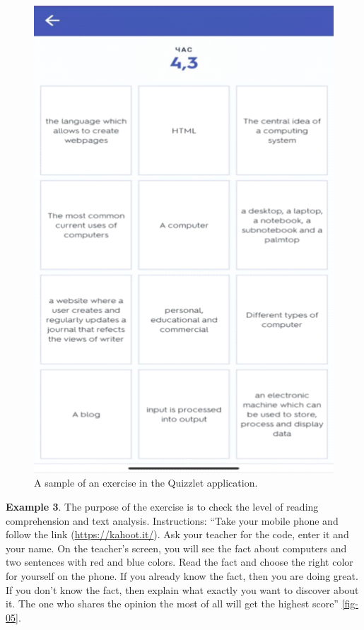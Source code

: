 \begin{figure}[htpb]
\centering
\begin{minipage}{.65\textwidth}
\caption{A sample of an exercise in the Quizzlet application.}	
\label{fig-04}
\includegraphics[width=\textwidth]{figure04}
\end{minipage}
\end{figure}

\textbf{Example 3}. The purpose of the exercise is to check the level of reading
comprehension and text analysis. Instructions: \enquote{Take your mobile
phone and follow the link (\url{https://kahoot.it/}). Ask your teacher
for the code, enter it and your name. On the teacher's screen, you will
see the fact about computers and two sentences with red and blue colors.
Read the fact and choose the right color for yourself on the phone. If
you already know the fact, then you are doing great. If you don't know
the fact, then explain what exactly you want to discover about it. The
one who shares the opinion the most of all will get the highest score}
\cref{fig-05}.


